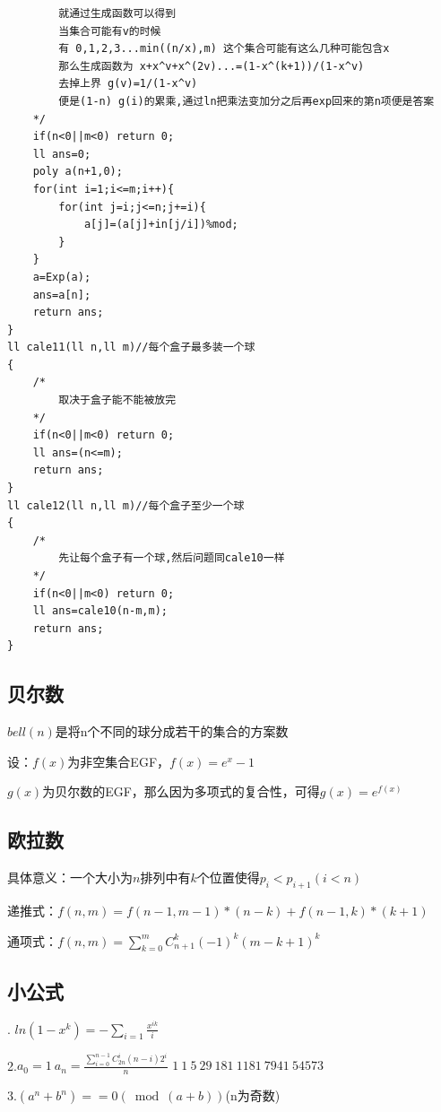 \documentclass[12pt, a4paper, oneside]{ctexart}
\begin{document}
\begin{lstlisting}
        就通过生成函数可以得到
        当集合可能有v的时候
        有 0,1,2,3...min((n/x),m) 这个集合可能有这么几种可能包含x
        那么生成函数为 x+x^v+x^(2v)...=(1-x^(k+1))/(1-x^v)
        去掉上界 g(v)=1/(1-x^v)
        便是(1-n) g(i)的累乘,通过ln把乘法变加分之后再exp回来的第n项便是答案
    */
    if(n<0||m<0) return 0;
    ll ans=0;
    poly a(n+1,0);
    for(int i=1;i<=m;i++){
        for(int j=i;j<=n;j+=i){
            a[j]=(a[j]+in[j/i])%mod;
        }
    }
    a=Exp(a);
    ans=a[n];
    return ans;
}
ll cale11(ll n,ll m)//每个盒子最多装一个球
{
    /*
        取决于盒子能不能被放完
    */
    if(n<0||m<0) return 0;
    ll ans=(n<=m);
    return ans;
}
ll cale12(ll n,ll m)//每个盒子至少一个球
{
    /*
        先让每个盒子有一个球,然后问题同cale10一样
    */
    if(n<0||m<0) return 0;
    ll ans=cale10(n-m,m);
    return ans;
}
\end{lstlisting}


\newpage 
\subsection{贝尔数} 
\flushleft
${bell(n)}$是将n个不同的球分成若干的集合的方案数\par

设：${f(x)}$为非空集合EGF，${f(x)=e^x-1}$  \par

​       ${g(x)}$为贝尔数的EGF，那么因为多项式的复合性，可得${g(x)=e^{f(x)}}$ \par
\centering

\subsection{欧拉数} 
\flushleft
具体意义：一个大小为${n}$排列中有${k}$个位置使得${p_i<p_{i+1}(i<n)}$  \par
递推式：${f(n,m)=f(n-1,m-1)*(n-k)+f(n-1,k)*(k+1)}$ \par

通项式：${f(n,m)={\sum_{k=0}^m}{C_{n+1}^k}(-1)^k(m-k+1)^k}$ \par
\centering


\subsection{小公式}
. ${ln(1-x^k)=-{\sum_{i=1}}{\frac{x^{ik}}{i}}}$ \par
2.${a_0=1\ a_n=\frac{\sum_{i=0}^{n-1}C_{2n}^i(n-i)2^i}{n}}$   ${1 \ 1\  5\  29\  181\  1181\  7941\  54573}$ \par
3.${(a^n+b^n)==0(\bmod (a+b))} $(n为奇数)\par
\centering
\end{document}
